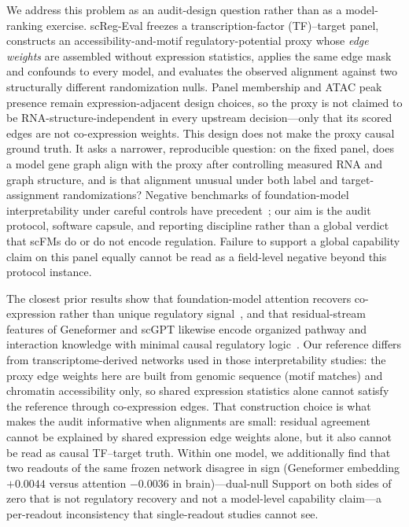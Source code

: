 \documentclass[fleqn,10pt,lineno]{wlpeerj}
\begin{document}
We address this problem as an audit-design question rather than as a model-ranking exercise.
scReg-Eval freezes a transcription-factor (TF)--target panel, constructs an accessibility-and-motif
regulatory-potential proxy whose \emph{edge weights} are assembled without expression statistics,
applies the same edge mask and confounds to every model, and evaluates the observed alignment
against two structurally different randomization nulls. Panel membership and ATAC peak presence
remain expression-adjacent design choices, so the proxy is not claimed to be
RNA-structure-independent in every upstream decision---only that its scored edges are not
co-expression weights. This design does not make the proxy causal ground truth. It asks a narrower,
reproducible question: on the fixed panel, does a model gene graph align with the proxy after
controlling measured RNA and graph structure, and is that alignment unusual under both
label and target-assignment randomizations? Negative benchmarks of foundation-model interpretability
under careful controls have precedent~\citep{ahlmanneltze2025linear,boiarsky2023deepdive,kedzierska2023assessing};
our aim is the audit protocol, software capsule, and reporting discipline rather than a global
verdict that scFMs do or do not encode regulation. Failure to support a global capability claim
on this panel equally cannot be read as a field-level negative beyond this protocol instance.

The closest prior results show that foundation-model attention recovers co-expression rather than
unique regulatory signal~\citep{kendiukhov2026scfm}, and that residual-stream features of Geneformer and scGPT
likewise encode organized pathway and interaction knowledge with minimal causal regulatory
logic~\citep{kendiukhov2026sae}. Our reference differs from transcriptome-derived networks used in those
interpretability studies: the proxy edge weights here are built from genomic sequence
(motif matches) and chromatin accessibility only, so shared expression statistics alone cannot
satisfy the reference through co-expression edges. That construction choice is what makes the audit
informative when alignments are small: residual agreement cannot be explained by shared expression
edge weights alone, but it also cannot be read as causal TF--target truth. Within one model, we
additionally find that two readouts of the same frozen network disagree in sign (Geneformer
embedding $+0.0044$ versus attention $-0.0036$ in brain)---dual-null Support on both sides of
zero that is not regulatory recovery and not a model-level capability claim---a per-readout
inconsistency that single-readout studies cannot see.
\end{document}
